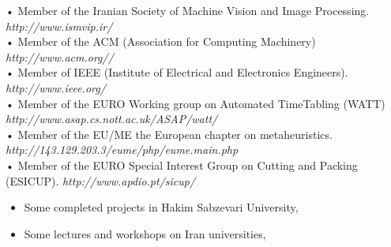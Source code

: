 \documentclass[10pt,a4paper]{moderncv}
\begin{document}
{\small • Member of the Iranian Society of Machine Vision and Image Processing. \hfill {\scriptsize\em http://www.ismvip.ir/}}\\
{\small • Member of the ACM (Association for Computing Machinery) \hfill {\scriptsize\em http://www.acm.org//}}\\
{\small • Member of IEEE (Institute of Electrical and Electronics Engineers). \hfill {\scriptsize\em http://www.ieee.org/}}\\
{\small • Member of the EURO Working group on Automated TimeTabling (WATT) \hfill {\scriptsize\em http://www.asap.cs.nott.ac.uk/ASAP/watt/}}\\
{\small • Member of the EU/ME the European chapter on metaheuristics. \hfill {\scriptsize\em http://143.129.203.3/eume/php/eume.main.php}}\\
{\small • Member of the EURO Special Interest Group on Cutting and Packing (ESICUP). \hfill {\scriptsize\em http://www.apdio.pt/sicup/}}\\

\begin{itemize}
\item Some completed projects in Hakim Sabzevari University, 
\item Some lectures and workshops on Iran universities,
\end{itemize}




\nocite{*}


\end{document}
